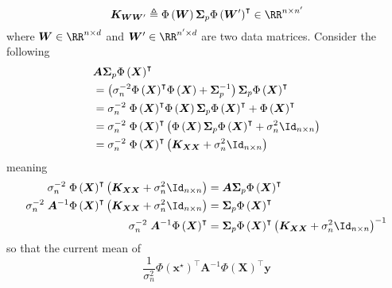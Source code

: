 \[
    \bm{K}_{\bm{W} \bm{W}'} \triangleq \Phi \left( \bm{W} \right) \bm{\Sigma}_p {\Phi \left( \bm{W}' \right)}^{\intercal} \in \RR^{n \times n'}
\]
where $\bm{W} \in \RR^{n \times d}$ and $\bm{W}' \in \RR^{n' \times d}$ are two data matrices. Consider the following
\begin{align*}
     & \bm{A} \bm{\Sigma}_p {\Phi \left( \bm{X} \right)}^{\intercal}                                                                                                                                \\
     & = \left( \sigma_n^{-2} {\Phi \left( \bm{X} \right)}^{\intercal} \Phi \left( \bm{X} \right) + \bm{\Sigma}_p^{-1} \right) \bm{\Sigma}_p {\Phi \left( \bm{X} \right)}^{\intercal}               \\
     & = \sigma_n^{-2} \; {\Phi \left( \bm{X} \right)}^{\intercal} \Phi \left( \bm{X} \right) \bm{\Sigma}_p {\Phi \left( \bm{X} \right)}^{\intercal} + {\Phi \left( \bm{X} \right)}^{\intercal}     \\
     & = \sigma_n^{-2} \; {\Phi \left( \bm{X} \right)}^{\intercal} \left( \Phi \left( \bm{X} \right) \bm{\Sigma}_p {\Phi \left( \bm{X} \right)}^{\intercal} + \sigma_n^{2} \Id_{n \times n} \right) \\
     & = \sigma_n^{-2} \; {\Phi \left( \bm{X} \right)}^{\intercal} \left( \bm{K}_{\bm{X} \bm{X}} + \sigma_n^{2} \Id_{n \times n} \right)
\end{align*}
meaning
\begin{align*}
    \sigma_n^{-2} \; {\Phi \left( \bm{X} \right)}^{\intercal} \left( \bm{K}_{\bm{X} \bm{X}} + \sigma_n^{2} \Id_{n \times n} \right)             & = \bm{A} \bm{\Sigma}_p {\Phi \left( \bm{X} \right)}^{\intercal}                                                                     \\
    \sigma_n^{-2} \; \bm{A}^{-1} {\Phi \left( \bm{X} \right)}^{\intercal} \left( \bm{K}_{\bm{X} \bm{X}} + \sigma_n^{2} \Id_{n \times n} \right) & = \bm{\Sigma}_p {\Phi \left( \bm{X} \right)}^{\intercal}                                                                            \\
    \sigma_n^{-2} \; \bm{A}^{-1} {\Phi \left( \bm{X} \right)}^{\intercal}                                                                       & = \bm{\Sigma}_p {\Phi \left( \bm{X} \right)}^{\intercal} \left( \bm{K}_{\bm{X} \bm{X}} + \sigma_n^{2} \Id_{n \times n} \right)^{-1}
\end{align*}
so that the current mean of
\[
    \frac{1}{\sigma_n^2} \Phi \left( \bm{x}^{\star} \right)^{\intercal} \bm{A}^{-1} {\Phi \left( \bm{X} \right)}^{\intercal} \bm{y}
\]
